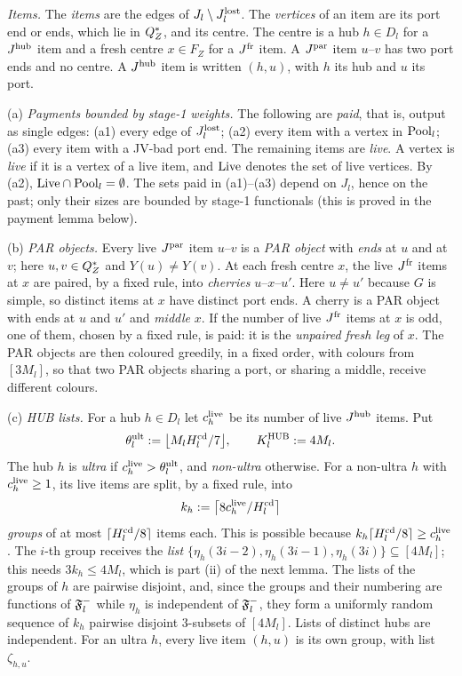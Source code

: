 \begin{construction}
\emph{Items.} The \emph{items} are the edges of $J_l\setminus J^{\mathrm{lost}}_l$. The
\emph{vertices} of an item are its port end or ends, which lie in $Q^{*}_Z$, and
its centre. The centre is a hub $h\in D_l$ for a $J^{\mathrm{hub}}$ item and a fresh centre
$x\in F_Z$ for a $J^{\mathrm{fr}}$ item. A $J^{\mathrm{par}}$ item $u$--$v$ has two port ends and no
centre. A $J^{\mathrm{hub}}$ item is written $(h,u)$, with $h$ its hub and $u$ its port.

\smallskip\noindent
(a) \emph{Payments bounded by stage-1 weights.} The following are \emph{paid},
that is, output as single edges:
(a1) every edge of $J^{\mathrm{lost}}_l$;
(a2) every item with a vertex in $\mathrm{Pool}_l$;
(a3) every item with a JV-bad port end.
The remaining items are \emph{live}. A vertex is \emph{live} if it is a vertex of
a live item, and $\mathrm{Live}$ denotes the set of live vertices. By (a2),
$\mathrm{Live}\cap\mathrm{Pool}_l=\emptyset$. The sets paid in (a1)--(a3) depend on $J_l$, hence
on the past; only their sizes are bounded by stage-1 functionals
(this is proved in the payment lemma below).

\smallskip\noindent
(b) \emph{PAR objects.} Every live $J^{\mathrm{par}}$ item $u$--$v$ is a \emph{PAR object}
with \emph{ends} at $u$ and at $v$; here $u,v\in Q^{*}_Z$ and $Y(u)\ne Y(v)$. At each
fresh centre $x$, the live $J^{\mathrm{fr}}$ items at $x$ are paired, by a fixed rule, into
\emph{cherries} $u$--$x$--$u'$. Here $u\ne u'$ because $G$ is simple, so
distinct items at $x$ have distinct port ends. A cherry is a PAR object with ends
at $u$ and $u'$ and \emph{middle} $x$. If the number of live $J^{\mathrm{fr}}$ items at $x$
is odd, one of them, chosen by a fixed rule, is paid: it is the \emph{unpaired
fresh leg} of $x$. The PAR objects are then coloured greedily, in a fixed order,
with colours from $[3M_l]$, so that two PAR objects sharing a port, or sharing a
middle, receive different colours.

\smallskip\noindent
(c) \emph{HUB lists.} For a hub $h\in D_l$ let $c^{\mathrm{live}}_h$ be its number of live
$J^{\mathrm{hub}}$ items. Put
\[
\theta^{\mathrm{ult}}_l\mathrel{:=}\bigl\lfloor M_lH^{\mathrm{cd}}_l/7\bigr\rfloor,\qquad K^{\mathrm{HUB}}_l\mathrel{:=}4M_l .
\]
The hub $h$ is \emph{ultra} if $c^{\mathrm{live}}_h>\theta^{\mathrm{ult}}_l$, and \emph{non-ultra}
otherwise. For a non-ultra $h$ with $c^{\mathrm{live}}_h\ge1$, its live items are split, by
a fixed rule, into
\[
k_h\mathrel{:=}\bigl\lceil 8c^{\mathrm{live}}_h/H^{\mathrm{cd}}_l\bigr\rceil
\]
\emph{groups} of at most $\lceil H^{\mathrm{cd}}_l/8\rceil$ items each. This is possible
because $k_h\lceil H^{\mathrm{cd}}_l/8\rceil\ge c^{\mathrm{live}}_h$. The $i$-th group receives the
\emph{list} $\{\eta_h(3i-2),\eta_h(3i-1),\eta_h(3i)\}\subseteq[4M_l]$; this needs
$3k_h\le4M_l$, which is part (ii) of the next lemma. The lists of the
groups of $h$ are pairwise disjoint, and, since the groups and their numbering
are functions of $\mathfrak{F}^{-}_l$ while $\eta_h$ is independent of $\mathfrak{F}^{-}_l$, they form
a uniformly random sequence of
$k_h$ pairwise disjoint $3$-subsets of $[4M_l]$. Lists of distinct hubs are
independent. For an ultra $h$, every live item $(h,u)$ is its own group, with
list $\zeta_{h,u}$.


\end{construction}

